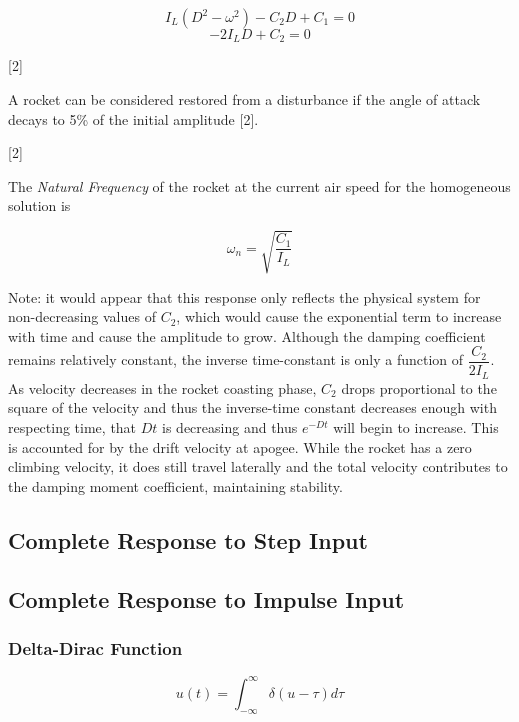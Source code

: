 \documentclass[]{article}
\begin{document}
\[
I_L (D^2 - \omega^2) - C_2 D + C_1 = 0
\] \[
-2 I_L D + C_2 = 0
\]

{[}2{]}

A rocket can be considered restored from a disturbance if the angle of
attack decays to 5\% of the initial amplitude {[}2{]}.

{[}2{]}

The \emph{Natural Frequency} of the rocket at the current air speed for
the homogeneous solution is

\begin{equation}
\label{eq_natural_frequency_homogeneous}
\omega_n = \sqrt{ \dfrac{C_1}{I_L} }
\end{equation}

Note: it would appear that this response only reflects the physical
system for non-decreasing values of \(C_2\), which would cause the
exponential term to increase with time and cause the amplitude to grow.
Although the damping coefficient remains relatively constant, the
inverse time-constant is only a function of \(\dfrac{C_2}{2 I_L}\). As
velocity decreases in the rocket coasting phase, \(C_2\) drops
proportional to the square of the velocity and thus the inverse-time
constant decreases enough with respecting time, that \(Dt\) is
decreasing and thus \(e^{-Dt}\) will begin to increase. This is
accounted for by the drift velocity at apogee. While the rocket has a
zero climbing velocity, it does still travel laterally and the total
velocity contributes to the damping moment coefficient, maintaining
stability.

\subsection{Complete Response to Step
Input}\label{complete-response-to-step-input}

\subsection{Complete Response to Impulse
Input}\label{complete-response-to-impulse-input}

\subsubsection{Delta-Dirac Function}\label{delta-dirac-function}

\begin{equation}
\label{eq_delta_dirac}
u(t) = \int_{-\infty}^{\infty} \delta ( u - \tau ) d \tau
\end{equation}
\end{document}
